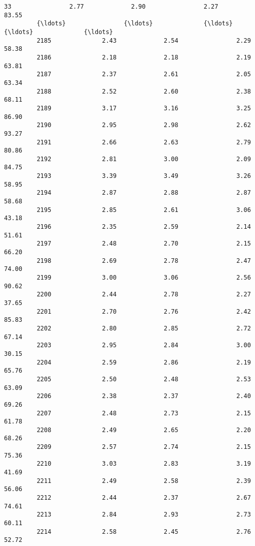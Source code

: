 \documentclass[11pt]{llncs}
\begin{document}
\begin{Verbatim}[commandchars=\\\{\}]
         33                2.77             2.90                2.27            83.55   
         {\ldots}                {\ldots}              {\ldots}                 {\ldots}              {\ldots}   
         2185              2.43             2.54                2.29            58.38   
         2186              2.18             2.18                2.19            63.81   
         2187              2.37             2.61                2.05            63.34   
         2188              2.52             2.60                2.38            68.11   
         2189              3.17             3.16                3.25            86.90   
         2190              2.95             2.98                2.62            93.27   
         2191              2.66             2.63                2.79            80.86   
         2192              2.81             3.00                2.09            84.75   
         2193              3.39             3.49                3.26            58.95   
         2194              2.87             2.88                2.87            58.68   
         2195              2.85             2.61                3.06            43.18   
         2196              2.35             2.59                2.14            51.61   
         2197              2.48             2.70                2.15            66.20   
         2198              2.69             2.78                2.47            74.00   
         2199              3.00             3.06                2.56            90.62   
         2200              2.44             2.78                2.27            37.65   
         2201              2.70             2.76                2.42            85.83   
         2202              2.80             2.85                2.72            67.14   
         2203              2.95             2.84                3.00            30.15   
         2204              2.59             2.86                2.19            65.76   
         2205              2.50             2.48                2.53            63.09   
         2206              2.38             2.37                2.40            69.26   
         2207              2.48             2.73                2.15            61.78   
         2208              2.49             2.65                2.20            68.26   
         2209              2.57             2.74                2.15            75.36   
         2210              3.03             2.83                3.19            41.69   
         2211              2.49             2.58                2.39            56.06   
         2212              2.44             2.37                2.67            74.61   
         2213              2.84             2.93                2.73            60.11   
         2214              2.58             2.45                2.76            52.72   
         

\end{Verbatim}
\end{document}
